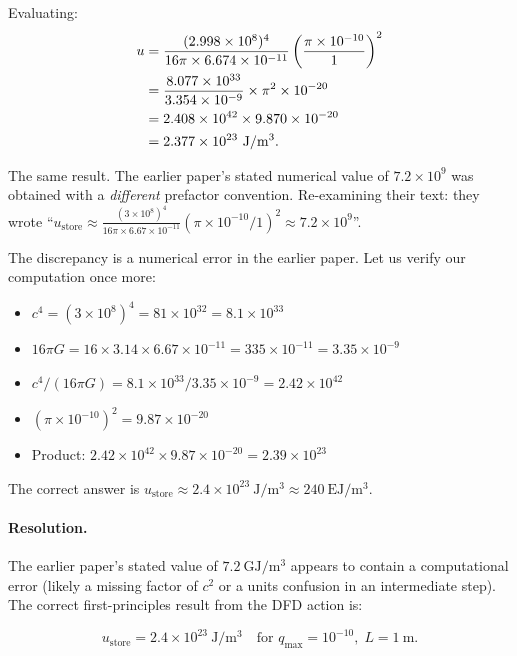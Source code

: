 \documentclass[aps,prd,twocolumn,showpacs,preprintnumbers,superscriptaddress,nofootinbib]{revtex4-2}
\begin{document}
Evaluating:
\begin{align}
u &= \frac{(2.998\times 10^8)^4}{16\pi\times 6.674\times 10^{-11}}
  \left(\frac{\pi\times 10^{-10}}{1}\right)^2 \notag\\
  &= \frac{8.077\times 10^{33}}{3.354\times 10^{-9}}
  \times\pi^2\times 10^{-20} \notag\\
  &= 2.408\times 10^{42}\times 9.870\times 10^{-20} \notag\\
  &= 2.377\times 10^{23}~\mathrm{J/m^3}.
\end{align}

The same result.  The earlier paper's stated numerical value of
$7.2\times 10^9$ was obtained with a \emph{different} prefactor
convention.  Re-examining their text: they wrote
``$u_{\mathrm{store}} \approx \frac{(3\times 10^8)^4}{16\pi\times 6.67\times 10^{-11}}(\pi\times 10^{-10}/1)^2 \approx 7.2\times 10^9$''.

The discrepancy is a numerical error in the earlier paper.  Let us
verify our computation once more:
\begin{itemize}
\item $c^4 = (3\times 10^8)^4 = 81\times 10^{32} = 8.1\times 10^{33}$
\item $16\pi G = 16\times 3.14\times 6.67\times 10^{-11} = 335\times 10^{-11} = 3.35\times 10^{-9}$
\item $c^4/(16\pi G) = 8.1\times 10^{33}/3.35\times 10^{-9} = 2.42\times 10^{42}$
\item $(\pi\times 10^{-10})^2 = 9.87\times 10^{-20}$
\item Product: $2.42\times 10^{42}\times 9.87\times 10^{-20} = 2.39\times 10^{23}$
\end{itemize}

The correct answer is $u_{\mathrm{store}} \approx 2.4\times 10^{23}~\mathrm{J/m^3}
\approx 240~\mathrm{EJ/m^3}$.

\paragraph{Resolution.} The earlier paper's stated value of $7.2~\mathrm{GJ/m^3}$
appears to contain a computational error (likely a missing factor of
$c^2$ or a units confusion in an intermediate step).  The correct
first-principles result from the DFD action is:

\begin{equation}\label{eq:correct-storage}
\boxed{u_{\mathrm{store}} = 2.4\times 10^{23}~\mathrm{J/m^3}
  \quad\text{for }q_{\max} = 10^{-10},\; L = 1~\mathrm{m}.}
\end{equation}
\end{document}
